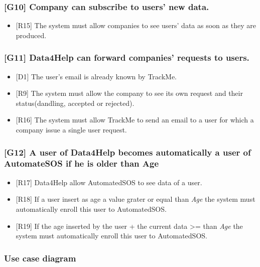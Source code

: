 \documentclass{article}
\begin{document}
\subsubsection{[G10] Company can subscribe to users’ new data.}
\begin{itemize}
\item {[R15]} The system must allow companies to see users' data as soon as they are produced.
\end{itemize}
\subsubsection{[G11] Data4Help can forward companies’ requests to users.}
\begin{itemize}
\item {[D1]} The user’s email is already known by TrackMe.
\item {[R9]} The system must allow the company to see its own request and their status(dandling, accepted or rejected).
\item {[R16]} The system must allow TrackMe to send an email to a user for which a company issue a single user request.
\end{itemize}
\subsubsection{[G12] A user of Data4Help becomes automatically a user of AutomateSOS if he is older than Age}
\begin{itemize}
\item {[R17]} Data4Help allow AutomatedSOS to see data of a user.
\item {[R18]} If a user insert as age a value grater or equal than \emph{Age} the system must automatically enroll this user to AutomatedSOS.
\item {[R19]} If the age inserted by the user + the current data >= than \emph{Age} the system must automatically enroll this user to AutomatedSOS. 
\end{itemize}\newpage
\subsubsection{Use case diagram}
\end{document}
